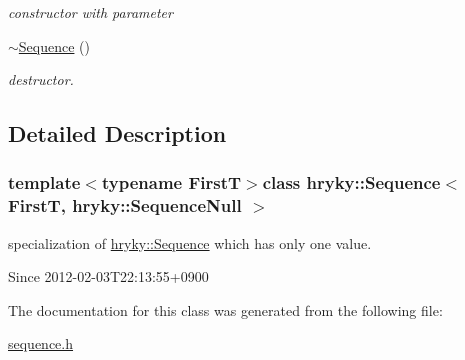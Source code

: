 \begin{DoxyCompactItemize}
\begin{DoxyCompactList}\small\item\em constructor with parameter \end{DoxyCompactList}\item 
\hypertarget{classhryky_1_1_sequence_3_01_first_t_00_01hryky_1_1_sequence_null_01_4_ac64f4120c4db7b5a4aaf7facaf017c3d}{\hyperlink{classhryky_1_1_sequence_3_01_first_t_00_01hryky_1_1_sequence_null_01_4_ac64f4120c4db7b5a4aaf7facaf017c3d}{$\sim$\-Sequence} ()}\label{classhryky_1_1_sequence_3_01_first_t_00_01hryky_1_1_sequence_null_01_4_ac64f4120c4db7b5a4aaf7facaf017c3d}

\begin{DoxyCompactList}\small\item\em destructor. \end{DoxyCompactList}\end{DoxyCompactItemize}


\subsection{Detailed Description}
\subsubsection*{template$<$typename First\-T$>$class hryky\-::\-Sequence$<$ First\-T, hryky\-::\-Sequence\-Null $>$}

specialization of \hyperlink{classhryky_1_1_sequence}{hryky\-::\-Sequence} which has only one value. 

\begin{DoxySince}{Since}
2012-\/02-\/03\-T22\-:13\-:55+0900 
\end{DoxySince}


The documentation for this class was generated from the following file\-:\begin{DoxyCompactItemize}
\item 
\hyperlink{sequence_8h}{sequence.\-h}\end{DoxyCompactItemize}
